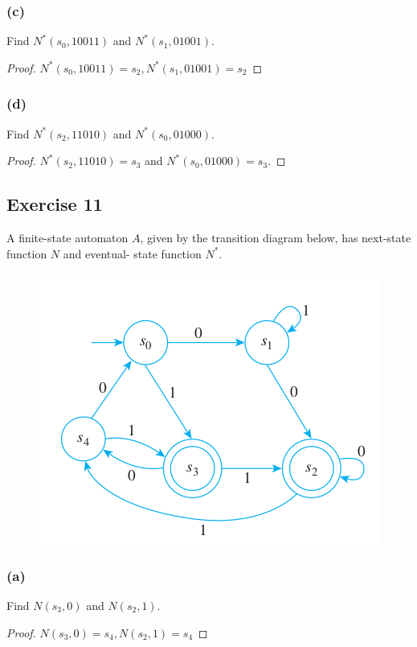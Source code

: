\documentclass[14pt]{extarticle}
\begin{document}
\subsubsection{(c)}
Find \(N^*(s_0, 10011)\) and \(N^*(s_1, 01001)\).
\begin{proof}
    \(N^*(s_0, 10011) = s_2, N^*(s_1, 01001) = s_2\)
\end{proof}


\subsubsection{(d)}
Find \(N^*(s_2, 11010)\) and \(N^*(s_0, 01000)\).
\begin{proof}
    \(N^*(s_2, 11010) = s_3\) and \(N^*(s_0, 01000) = s_3\).
\end{proof}


\subsection{Exercise 11}
A finite-state automaton \(A\), given by the transition diagram below, has next-state function \(N\) and eventual-
state function \(N^*\).

\begin{figure}[ht!]
    \centering
    \includegraphics[scale=0.5]{../images/12.2.11.png}
\end{figure}

\subsubsection{(a)}
Find \(N(s_3, 0)\) and \(N(s_2, 1)\).
\begin{proof}
    \(N(s_3, 0) = s_4, N(s_2, 1) = s_4\)
\end{proof}
\end{document}
